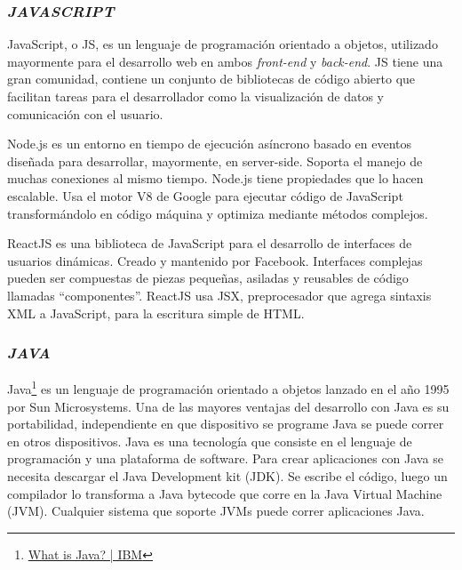 \subsubsection{\textit{JAVASCRIPT}}

JavaScript, o JS, es un lenguaje de programación orientado a objetos, utilizado mayormente para el desarrollo web en ambos \textit{front-end} y \textit{back-end}. JS tiene una gran comunidad, contiene un conjunto de bibliotecas de código abierto que facilitan tareas para el desarrollador como la visualización de datos y comunicación con el usuario.


Node.js es un entorno en tiempo de ejecución asíncrono basado en eventos diseñada para desarrollar, mayormente, en server-side. Soporta el manejo de muchas conexiones al mismo tiempo. Node.js tiene propiedades que lo hacen escalable. Usa el motor V8 de Google para ejecutar código de JavaScript transformándolo en código máquina y optimiza mediante métodos complejos. \cite{webframedbws}


ReactJS es una biblioteca de JavaScript para el desarrollo de interfaces de usuarios dinámicas. Creado y mantenido por Facebook. Interfaces complejas pueden ser compuestas de piezas pequeñas, asiladas y reusables de código llamadas “componentes”. ReactJS usa JSX, preprocesador que agrega sintaxis XML a JavaScript, para la escritura simple de HTML. \cite{webframedbws}

\subsubsection{\textit{JAVA}}

Java\footnote{\href{https://www.ibm.com/cloud/learn/java-explained}{What is Java? | IBM}} es un lenguaje de programación orientado a objetos lanzado en el año 1995 por Sun Microsystems. Una de las mayores ventajas del desarrollo con Java es su portabilidad, independiente en que dispositivo se programe Java se puede correr en otros dispositivos.
Java es una tecnología que consiste en el lenguaje de programación y una plataforma de software. Para crear aplicaciones con Java se necesita descargar el Java Development kit (JDK). Se escribe el código, luego un compilador lo transforma a Java bytecode que corre en la Java Virtual Machine (JVM). Cualquier sistema que soporte JVMs puede correr aplicaciones Java.

